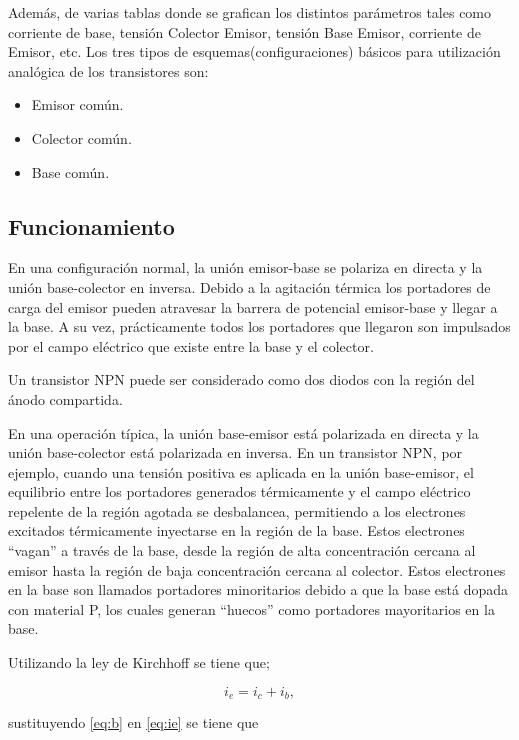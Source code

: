 \documentclass{article}
\begin{document}
Además, de varias tablas donde se grafican los distintos parámetros
tales como corriente de base, tensión Colector Emisor, tensión Base
Emisor, corriente de Emisor, etc. Los tres tipos de
esquemas(configuraciones) básicos para utilización analógica de los
transistores son:

\begin{itemize}
\itemsep1pt\parskip0pt
\item
  Emisor común.
\item
  Colector común.
\item
  Base común.
\end{itemize}

\subsection{Funcionamiento}\label{funcionamiento}

En una configuración normal, la unión emisor-base se polariza en directa
y la unión base-colector en inversa. Debido a la agitación térmica los
portadores de carga del emisor pueden atravesar la barrera de potencial
emisor-base y llegar a la base. A su vez, prácticamente todos los
portadores que llegaron son impulsados por el campo eléctrico que existe
entre la base y el colector.

Un transistor NPN puede ser considerado como dos diodos con la región
del ánodo compartida.

En una operación típica, la unión base-emisor está polarizada en directa
y la unión base-colector está polarizada en inversa. En un transistor
NPN, por ejemplo, cuando una tensión positiva es aplicada en la unión
base-emisor, el equilibrio entre los portadores generados térmicamente y
el campo eléctrico repelente de la región agotada se desbalancea,
permitiendo a los electrones excitados térmicamente inyectarse en la
región de la base. Estos electrones ``vagan'' a través de la base, desde
la región de alta concentración cercana al emisor hasta la región de
baja concentración cercana al colector. Estos electrones en la base son
llamados portadores minoritarios debido a que la base está dopada con
material P, los cuales generan ``huecos'' como portadores mayoritarios
en la base.

Utilizando la ley de Kirchhoff se tiene que;

\begin{equation}\label{eq:ie}
i_{e}=i_{c}+i_{b},
\end{equation}

sustituyendo \eqref{eq:b} en \eqref{eq:ie} se tiene que
\end{document}
